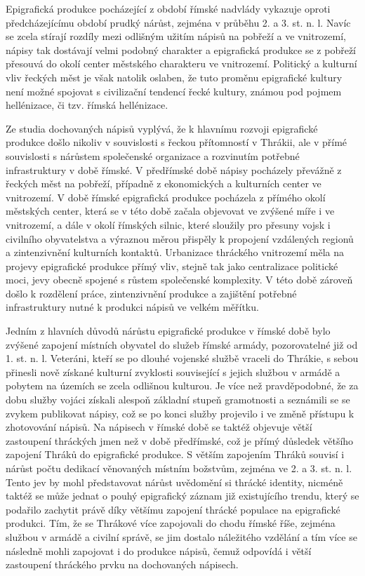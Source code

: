 Epigrafická produkce pocházející z období římské nadvlády vykazuje oproti předcházejícímu období prudký nárůst, zejména v průběhu 2. a 3. st. n. l. Navíc se zcela stírají rozdíly mezi odlišným užitím nápisů na pobřeží a ve vnitrozemí, nápisy tak dostávají velmi podobný charakter a epigrafická produkce se z pobřeží přesouvá do okolí center městského charakteru ve vnitrozemí. Politický a kulturní vliv řeckých měst je však natolik oslaben, že tuto proměnu epigrafické kultury není možné spojovat s civilizační tendencí řecké kultury, známou pod pojmem hellénizace, či tzv. římská hellénizace.

Ze studia dochovaných nápisů vyplývá, že k hlavnímu rozvoji epigrafické produkce došlo nikoliv v souvislosti s řeckou přítomností v Thrákii, ale v přímé souvislosti s nárůstem společenské organizace a rozvinutím potřebné infrastruktury v době římské. V předřímské době nápisy pocházely převážně z řeckých měst na pobřeží, případně z ekonomických a kulturních center ve vnitrozemí. V době římské epigrafická produkce pocházela z přímého okolí městských center, která se v této době začala objevovat ve zvýšené míře i ve vnitrozemí, a dále v okolí římských silnic, které sloužily pro přesuny vojsk i civilního obyvatelstva a výraznou měrou přispěly k propojení vzdálených regionů a zintenzivnění kulturních kontaktů. Urbanizace thráckého vnitrozemí měla na projevy epigrafické produkce přímý vliv, stejně tak jako centralizace politické moci, jevy obecně spojené s růstem společenské komplexity. V této době zároveň došlo k rozdělení práce, zintenzivnění produkce a zajištění potřebné infrastruktury nutné k produkci nápisů ve velkém měřítku.

Jedním z hlavních důvodů nárůstu epigrafické produkce v římské době bylo zvýšené zapojení místních obyvatel do služeb římské armády, pozorovatelné již od 1. st. n. l. Veteráni, kteří se po dlouhé vojenské službě vraceli do Thrákie, s sebou přinesli nově získané kulturní zvyklosti související s jejich službou v armádě a pobytem na územích se zcela odlišnou kulturou. Je více než pravděpodobné, že za dobu služby vojáci získali alespoň základní stupeň gramotnosti a seznámili se se zvykem publikovat nápisy, což se po konci služby projevilo i ve změně přístupu k zhotovování nápisů. Na nápisech v římské době se taktéž objevuje větší zastoupení thráckých jmen než v době předřímské, což je přímý důsledek většího zapojení Thráků do epigrafické produkce. S větším zapojením Thráků souvisí i nárůst počtu dedikací věnovaných místním božstvům, zejména ve 2. a 3. st. n. l. Tento jev by mohl představovat nárůst uvědomění si thrácké identity, nicméně taktéž se může jednat o pouhý epigrafický záznam již existujícího trendu, který se podařilo zachytit právě díky většímu zapojení thrácké populace na epigrafické produkci. Tím, že se Thrákové více zapojovali do chodu římské říše, zejména službou v armádě a civilní správě, se jim dostalo náležitého vzdělání a tím více se následně mohli zapojovat i do produkce nápisů, čemuž odpovídá i větší zastoupení thráckého prvku na dochovaných nápisech.

